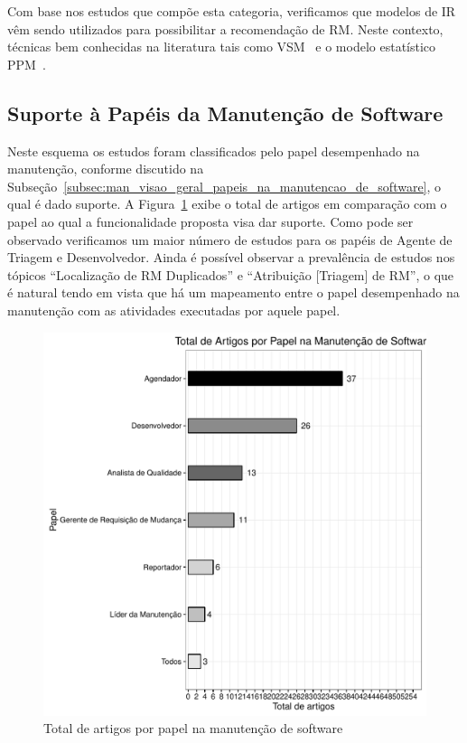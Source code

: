 Com base nos estudos que compõe esta categoria, verificamos que modelos de IR
vêm sendo utilizados para possibilitar a recomendação de RM\@. Neste contexto,
técnicas bem conhecidas na literatura tais como VSM~\cite{Wang2011bug} e o
modelo estatístico PPM~\cite{malheiros2012source}.

\subsection{Suporte à Papéis da Manutenção de Software}
\label{sub:extensões_com_suporte_a_papeis}

Neste esquema os estudos foram classificados pelo papel desempenhado na
manutenção, conforme discutido na
Subseção~\ref{subsec:man_visao_geral_papeis_na_manutencao_de_software}, o qual é
dado suporte. A Figura~\ref{fig:graf_papel_por_artigo} exibe o total de artigos
em comparação com o papel ao qual a funcionalidade proposta visa dar suporte.
Como pode ser observado verificamos um maior número de estudos para os papéis de
Agente de Triagem e Desenvolvedor. Ainda é possível observar a prevalência de
estudos nos tópicos ``Localização de RM Duplicados'' e ``Atribuição [Triagem] de
RM'', o que é natural tendo em vista que há um mapeamento entre o papel
desempenhado na manutenção com as atividades executadas por aquele papel.

\begin{figure}[htpb] \centering
	\includegraphics[width=0.7\linewidth]{chapter-mapeamento-sistematico/img/grafico_papel_por_artigo.pdf}
	\caption{Total de artigos por papel na manutenção de
		software}\label{fig:graf_papel_por_artigo} \end{figure}

